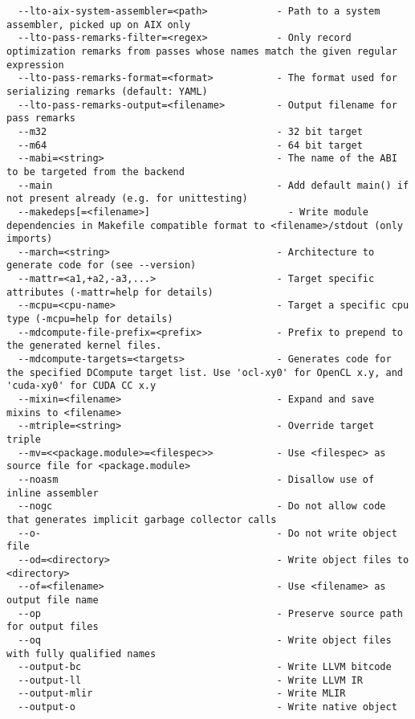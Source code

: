 \documentclass[732]{studrep}
\begin{document}
\begin{verbatim}
  --lto-aix-system-assembler=<path>            - Path to a system assembler, picked up on AIX only
  --lto-pass-remarks-filter=<regex>            - Only record optimization remarks from passes whose names match the given regular expression
  --lto-pass-remarks-format=<format>           - The format used for serializing remarks (default: YAML)
  --lto-pass-remarks-output=<filename>         - Output filename for pass remarks
  --m32                                        - 32 bit target
  --m64                                        - 64 bit target
  --mabi=<string>                              - The name of the ABI to be targeted from the backend
  --main                                       - Add default main() if not present already (e.g. for unittesting)
  --makedeps[=<filename>]                        - Write module dependencies in Makefile compatible format to <filename>/stdout (only imports)
  --march=<string>                             - Architecture to generate code for (see --version)
  --mattr=<a1,+a2,-a3,...>                     - Target specific attributes (-mattr=help for details)
  --mcpu=<cpu-name>                            - Target a specific cpu type (-mcpu=help for details)
  --mdcompute-file-prefix=<prefix>             - Prefix to prepend to the generated kernel files.
  --mdcompute-targets=<targets>                - Generates code for the specified DCompute target list. Use 'ocl-xy0' for OpenCL x.y, and 'cuda-xy0' for CUDA CC x.y
  --mixin=<filename>                           - Expand and save mixins to <filename>
  --mtriple=<string>                           - Override target triple
  --mv=<<package.module>=<filespec>>           - Use <filespec> as source file for <package.module>
  --noasm                                      - Disallow use of inline assembler
  --nogc                                       - Do not allow code that generates implicit garbage collector calls
  --o-                                         - Do not write object file
  --od=<directory>                             - Write object files to <directory>
  --of=<filename>                              - Use <filename> as output file name
  --op                                         - Preserve source path for output files
  --oq                                         - Write object files with fully qualified names
  --output-bc                                  - Write LLVM bitcode
  --output-ll                                  - Write LLVM IR
  --output-mlir                                - Write MLIR
  --output-o                                   - Write native object

\end{verbatim}
\end{document}
